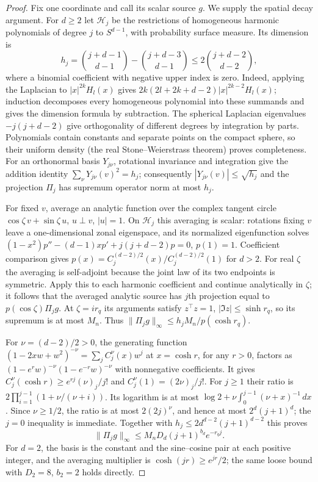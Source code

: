 \begin{proof}
Fix one coordinate and call its scalar source $g$.
We supply the spatial decay argument. For $d\ge2$ let
$\mathcal H_j$ be the restrictions of homogeneous harmonic
polynomials of degree $j$ to $S^{d-1}$, with probability surface
measure. Its dimension is
\[
 h_j=\binom{j+d-1}{d-1}-\binom{j+d-3}{d-1}
       \le2\binom{j+d-2}{d-2},
\]
where a binomial coefficient with negative upper index is zero.
Indeed, applying the Laplacian to $|x|^{2k}H_l(x)$ gives
$2k(2l+2k+d-2)|x|^{2k-2}H_l(x)$; induction decomposes every
homogeneous polynomial into these summands and gives the dimension
formula by subtraction. The spherical Laplacian eigenvalues
$-j(j+d-2)$ give orthogonality of different degrees by integration
by parts. Polynomials contain constants and separate points on the
compact sphere, so their uniform density (the real Stone--Weierstrass
theorem) proves completeness. For an orthonormal basis $Y_{j\nu}$,
rotational invariance and integration give the addition identity
$\sum_\nu Y_{j\nu}(v)^2=h_j$; consequently
$|Y_{j\nu}(v)|\le\sqrt{h_j}$ and the projection $\Pi_j$ has
supremum operator norm at most $h_j$.

For fixed $v$, average an analytic function over the complex tangent
circle $\cos\zeta\,v+\sin\zeta\,u$, $u\perp v$, $|u|=1$.
On $\mathcal H_j$ this averaging is scalar: rotations fixing $v$
leave a one-dimensional zonal eigenspace, and its normalized
eigenfunction solves
$(1-x^2)p''-(d-1)xp'+j(j+d-2)p=0$, $p(1)=1$.
Coefficient comparison gives
$p(x)=C_j^{(d-2)/2}(x)/C_j^{(d-2)/2}(1)$ for $d>2$.
For real $\zeta$ the averaging is self-adjoint because the joint
law of its two endpoints is symmetric. Apply this to each harmonic
coefficient and continue analytically in $\zeta$; it follows that
the averaged analytic source has $j$th projection equal to
$p(\cos\zeta)\Pi_jg$. At $\zeta=ir_q$ its arguments satisfy
$z^\top z=1$, $|\Im z|\le\sinh r_q$, so its supremum is at most
$M_n$. Thus $\|\Pi_jg\|_\infty\le h_jM_n/p(\cosh r_q)$.

For $\nu=(d-2)/2>0$, the generating function
$(1-2xw+w^2)^{-\nu}=\sum_j C_j^\nu(x)w^j$
at $x=\cosh r$, for any $r>0$, factors as
$(1-e^rw)^{-\nu}(1-e^{-r}w)^{-\nu}$ with nonnegative coefficients.
It gives $C_j^\nu(\cosh r)\ge e^{rj}(\nu)_j/j!$ and
$C_j^\nu(1)=(2\nu)_j/j!$. For $j\ge1$ their ratio is
$2\prod_{i=1}^{j-1}(1+\nu/(\nu+i))$.
Its logarithm is at most
$\log2+\nu\int_0^{j-1}(\nu+x)^{-1}\,dx$.
Since $\nu\ge1/2$, the ratio is at most $2(2j)^\nu$, and hence
at most $2^d(j+1)^d$; the $j=0$ inequality is immediate.
Together with
$h_j\le2d^{d-2}(j+1)^{d-2}$ this proves
\begin{equation}
 \|\Pi_jg\|_\infty\le M_nD_d(j+1)^{b_d}e^{-r_qj}.
 \label{cp:spatial-decay}
\end{equation}
For $d=2$, the basis is the constant and the sine--cosine pair at
each positive integer, and the averaging multiplier is
$\cosh(jr)\ge e^{jr}/2$; the same loose bound with $D_2=8$, $b_2=2$
holds directly.


\end{proof}
